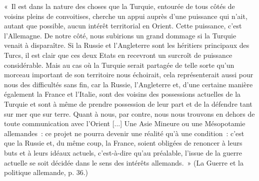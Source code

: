 \documentclass[french,twoside]{book} %
\newenvironment{quoteblock}%
  {\begin{quoting}}
  {\end{quoting}}
\newenvironment{quotebar}{%
    \def\FrameCommand{{\color{rubric!10!}\vrule width 0.5em} \hspace{0.9em}}%
    \def\OuterFrameSep{\itemsep} %
    \MakeFramed {\advance\hsize-\width \FrameRestore}
  }%
  {%
    \endMakeFramed
  }
\renewenvironment{quoteblock}%
  {%
    \savenotes
    \setstretch{0.9}
    \normalfont
    \begin{quotebar}
  }
  {%
    \end{quotebar}
    \spewnotes
  }
\begin{document}
\begin{quoteblock}
 \noindent « Il est dans la nature des choses que la Turquie, entourée de tous côtés de voisins pleins de convoitises, cherche un appui auprès d’une puissance qui n’ait, autant que possible, aucun intérêt territorial en Orient. Cette puissance, c’est l’Allemagne. De notre côté, nous subirions un grand dommage si la Turquie venait à disparaître. Si la Russie et l’Angleterre sont les héritiers principaux des Turcs, il est clair que ces deux Etats en recevront un surcroît de puissance considérable. Mais au cas où la Turquie serait partagée de telle sorte qu’un morceau important de son territoire nous échoirait, cela représenterait aussi pour nous des difficultés sans fin, car la Russie, l’Angleterre et, d’une certaine manière également la France et l’Italie, sont des voisins des possessions actuelles de la Turquie et sont à même de prendre possession de leur part et de la défendre tant sur mer que sur terre. Quant à nous, par contre, nous nous trouvons en dehors de toute communication avec l’Orient [...] Une Asie Mineure ou une Mésopotamie allemandes : ce projet ne pourra devenir une réalité qu’à une condition : c’est que la Russie et, du même coup, la France, soient obligées de renoncer à leurs buts et à leurs idéaux actuels, c’est-à-dire qu’au préalable, l’issue de la guerre actuelle se soit décidée dans le sens des intérêts allemands. » (La Guerre et la politique allemande, p. 36.)
\end{quoteblock}
\end{document}
